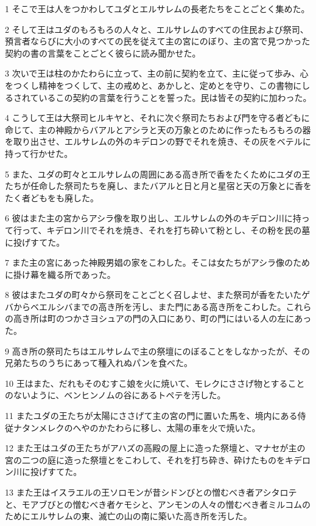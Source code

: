\par 1 そこで王は人をつかわしてユダとエルサレムの長老たちをことごとく集めた。
\par 2 そして王はユダのもろもろの人々と、エルサレムのすべての住民および祭司、預言者ならびに大小のすべての民を従えて主の宮にのぼり、主の宮で見つかった契約の書の言葉をことごとく彼らに読み聞かせた。
\par 3 次いで王は柱のかたわらに立って、主の前に契約を立て、主に従って歩み、心をつくし精神をつくして、主の戒めと、あかしと、定めとを守り、この書物にしるされているこの契約の言葉を行うことを誓った。民は皆その契約に加わった。
\par 4 こうして王は大祭司ヒルキヤと、それに次ぐ祭司たちおよび門を守る者どもに命じて、主の神殿からバアルとアシラと天の万象とのために作ったもろもろの器を取り出させ、エルサレムの外のキデロンの野でそれを焼き、その灰をベテルに持って行かせた。
\par 5 また、ユダの町々とエルサレムの周囲にある高き所で香をたくためにユダの王たちが任命した祭司たちを廃し、またバアルと日と月と星宿と天の万象とに香をたく者どもをも廃した。
\par 6 彼はまた主の宮からアシラ像を取り出し、エルサレムの外のキデロン川に持って行って、キデロン川でそれを焼き、それを打ち砕いて粉とし、その粉を民の墓に投げすてた。
\par 7 また主の宮にあった神殿男娼の家をこわした。そこは女たちがアシラ像のために掛け幕を織る所であった。
\par 8 彼はまたユダの町々から祭司をことごとく召しよせ、また祭司が香をたいたゲバからベエルシバまでの高き所を汚し、また門にある高き所をこわした。これらの高き所は町のつかさヨシュアの門の入口にあり、町の門にはいる人の左にあった。
\par 9 高き所の祭司たちはエルサレムで主の祭壇にのぼることをしなかったが、その兄弟たちのうちにあって種入れぬパンを食べた。
\par 10 王はまた、だれもそのむすこ娘を火に焼いて、モレクにささげ物とすることのないように、ベンヒンノムの谷にあるトペテを汚した。
\par 11 またユダの王たちが太陽にささげて主の宮の門に置いた馬を、境内にある侍従ナタンメレクのへやのかたわらに移し、太陽の車を火で焼いた。
\par 12 また王はユダの王たちがアハズの高殿の屋上に造った祭壇と、マナセが主の宮の二つの庭に造った祭壇とをこわして、それを打ち砕き、砕けたものをキデロン川に投げすてた。
\par 13 また王はイスラエルの王ソロモンが昔シドンびとの憎むべき者アシタロテと、モアブびとの憎むべき者ケモシと、アンモンの人々の憎むべき者ミルコムのためにエルサレムの東、滅亡の山の南に築いた高き所を汚した。
